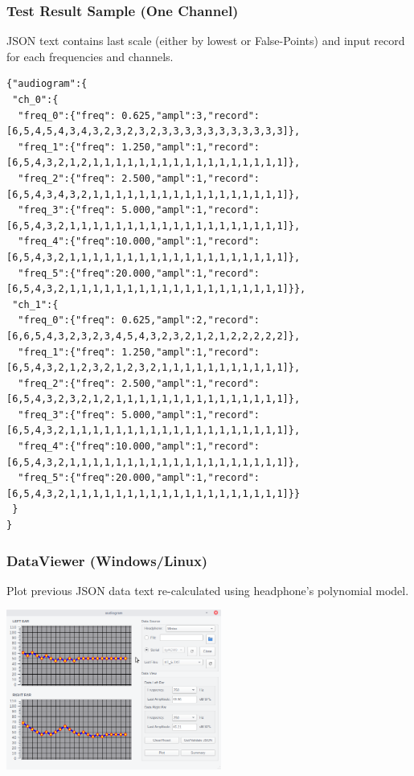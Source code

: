 \documentclass[table,dvipsnames]{beamer}
\begin{document}
	\begin{frame}[fragile]
		\frametitle{Test Result Sample (One Channel)}
	
		\begin{exampleblock}{}
			JSON text contains last scale (either by lowest or False-Points) and input record for each frequencies and channels.
		\end{exampleblock}
	
		\begin{exampleblock}{}
			\begin{verbatim}
{"audiogram":{
 "ch_0":{
  "freq_0":{"freq": 0.625,"ampl":3,"record":[6,5,4,5,4,3,4,3,2,3,2,3,2,3,3,3,3,3,3,3,3,3,3,3]},
  "freq_1":{"freq": 1.250,"ampl":1,"record":[6,5,4,3,2,1,2,1,1,1,1,1,1,1,1,1,1,1,1,1,1,1,1,1]},
  "freq_2":{"freq": 2.500,"ampl":1,"record":[6,5,4,3,4,3,2,1,1,1,1,1,1,1,1,1,1,1,1,1,1,1,1,1]},
  "freq_3":{"freq": 5.000,"ampl":1,"record":[6,5,4,3,2,1,1,1,1,1,1,1,1,1,1,1,1,1,1,1,1,1,1,1]},
  "freq_4":{"freq":10.000,"ampl":1,"record":[6,5,4,3,2,1,1,1,1,1,1,1,1,1,1,1,1,1,1,1,1,1,1,1]},
  "freq_5":{"freq":20.000,"ampl":1,"record":[6,5,4,3,2,1,1,1,1,1,1,1,1,1,1,1,1,1,1,1,1,1,1,1]}},
 "ch_1":{
  "freq_0":{"freq": 0.625,"ampl":2,"record":[6,6,5,4,3,2,3,2,3,4,5,4,3,2,3,2,1,2,1,2,2,2,2,2]},
  "freq_1":{"freq": 1.250,"ampl":1,"record":[6,5,4,3,2,1,2,3,2,1,2,3,2,1,1,1,1,1,1,1,1,1,1,1]},
  "freq_2":{"freq": 2.500,"ampl":1,"record":[6,5,4,3,2,3,2,1,2,1,1,1,1,1,1,1,1,1,1,1,1,1,1,1]},
  "freq_3":{"freq": 5.000,"ampl":1,"record":[6,5,4,3,2,1,1,1,1,1,1,1,1,1,1,1,1,1,1,1,1,1,1,1]},
  "freq_4":{"freq":10.000,"ampl":1,"record":[6,5,4,3,2,1,1,1,1,1,1,1,1,1,1,1,1,1,1,1,1,1,1,1]},
  "freq_5":{"freq":20.000,"ampl":1,"record":[6,5,4,3,2,1,1,1,1,1,1,1,1,1,1,1,1,1,1,1,1,1,1,1]}}
 }
}
			\end{verbatim}
		\end{exampleblock}
	\end{frame}

	\begin{frame}[fragile]
		\frametitle{DataViewer (Windows/Linux)}
		
		\begin{exampleblock}{}
			Plot previous JSON data text re-calculated using headphone's polynomial model.
		\end{exampleblock}
	
		\begin{exampleblock}{}
			\begin{center}
				\includegraphics[width=200pt]{images/elbicare_qt5}
			\end{center}
		\end{exampleblock}
	\end{frame}
\end{document}
